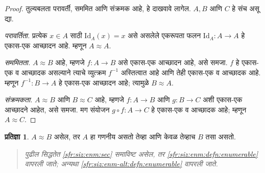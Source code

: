 \documentclass[11pt,a4paper,openany]{book}
\theoremstyle{definition}
\newtheorem{prop}[defn]{प्रतिज्ञा}
\newcommand{\Id}[1]{\mathord{\mathrm{Id}_{#1}}}
\newcommand{\comp}[2]{#2\circ #1}
\newcommand{\cardeq}[2]{#1 \approx #2}
\newenvironment{editorial}{\begin{quote}\small\itshape}{\end{quote}}
\begin{document}
\begin{proof}
तुल्यबलता परावर्ती, सममित आणि संक्रमक आहे, हे दाखवावे लागेल. $A, B$
आणि $C$ हे संच असू द्या.

\emph{परावर्तिता.} प्रत्येक $x \in A$ साठी $\Id{A} (x) = x$ असे
असलेले एकरूपता फलन $\Id{A} \colon A \to A$ हे एकास-एक आच्छादन आहे.
म्हणून $\cardeq{A}{A}$.

\emph{सममितता.} $\cardeq{A}{B}$ आहे, म्हणजे $f\colon A \to B$ असे
एकास-एक आच्छादन आहे, असे समजा. $f$ हे एकास-एक व आच्छादक असल्याने त्याचे
व्युत्क्रम $f^{-1}$ अस्तित्वात आहे आणि तेही एकास-एक व आच्छादक आहे. म्हणून
$f^{-1}\colon B \to A$ हे एकास-एक आच्छादन आहे; त्यामुळे
$\cardeq{B}{A}$.

\emph{संक्रमकता.} $\cardeq{A}{B}$ आणि $\cardeq{B}{C}$ आहे, म्हणजे
$f\colon A \to B$ आणि $g\colon B \to
C$ अशी एकास-एक आच्छादने आहेत, असे समजा. मग संयोजन
$\comp{f}{g}\colon A \to C$ हे एकास-एक व आच्छादक आहे; म्हणून
$\cardeq{A}{C}$.
\end{proof}

\begin{prop}
$\cardeq{A}{B}$ असेल, तर $A$ हा गणनीय असतो तेव्हा आणि केवळ
तेव्हाच $B$ तसा असतो.
\end{prop}

\begin{editorial}
पुढील सिद्धतेत \ref{sfr:siz:enm:sec} समाविष्ट असेल, तर
\ref{sfr:siz:enm:defn:enumerable} वापरली जाते; अन्यथा
\ref{sfr:siz:enm-alt:defn:enumerable} वापरली जाते.
\end{editorial}
\end{document}
